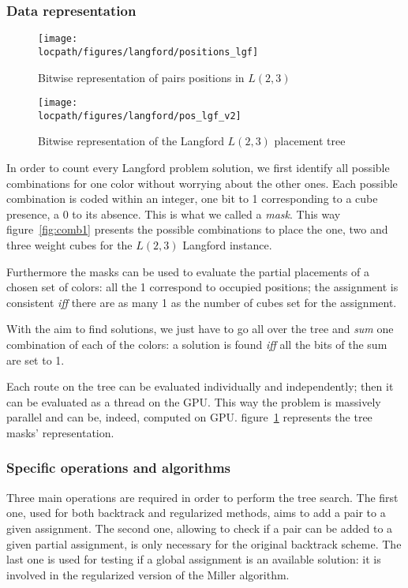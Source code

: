 \subsubsection{Data representation}

\begin{figure}[t!]
\begin{minipage}[b]{0.40\linewidth}
\centering
\texttt{[image: \\locpath/figures/langford/positions\_lgf]}
\caption{ Bitwise representation of pairs positions in $L(2,3)$} \label{fig:comb1}
\end{minipage}
\hfill
\begin{minipage}[b]{0.55\linewidth}
\centering
\texttt{[image: \\locpath/figures/langford/pos\_lgf\_v2]}
\caption{Bitwise representation of the Langford $L(2,3)$ placement tree}\label{fig:pos_lgf}
\end{minipage}
\end{figure}

In order to count every Langford problem solution, we first identify all possible combinations for one color without worrying about the other ones. 
Each possible combination is coded within an integer, one bit to 1 corresponding to a cube presence, a 0 to its absence. This is what we called a \emph{mask}.
This way figure~\ref{fig:comb1} presents the possible combinations to place the one, two and three weight cubes for the $L(2,3)$ Langford instance.

Furthermore the masks can be used to evaluate the partial placements of a chosen set of colors: all the 1 correspond to occupied positions; the assignment is consistent \emph{iff} there are as many 1 as the number of cubes set for the assignment. 

With the aim to find solutions, we just have to go all over the tree and \emph{sum} one combination of each of the colors: a solution is found \emph{iff} all the bits of the sum are set to 1. 

Each route on the tree can be evaluated individually and independently; then it can be evaluated as a thread on the GPU.
This way the problem is massively parallel and can be, indeed, computed on GPU. figure~\ref{fig:pos_lgf} represents the tree masks' representation.

\subsubsection{Specific operations and algorithms}

Three main operations are required in order to perform the tree search. 
The first one, used for both backtrack and regularized methods, aims to add a pair to a given assignment. 
The second one, allowing to check if a pair can be added to a given partial assignment, is only necessary for the original backtrack scheme.
The last one is used for testing if a global assignment is an available solution: it is involved in the regularized version of the Miller algorithm.

